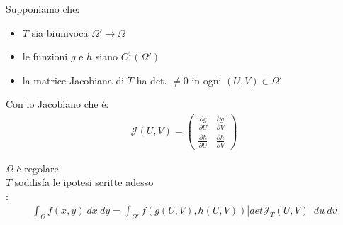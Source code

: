 \documentclass[a4paper, oneside]{article}
\begin{document}
Supponiamo che:
\begin{itemize}
    \item $T$ sia biunivoca $\Omega ' \to \Omega$
    \item le funzioni $g$ e $h$ siano $C^1 (\Omega')$
    \item la matrice Jacobiana di $T$ ha det. $\neq 0$ in ogni $(U,V) \in \Omega'$
\end{itemize}
Con lo Jacobiano che è:
\begin{gather*}
    \mathcal{J} (U,V) = \begin{pmatrix}
        \frac{\partial g}{\partial U} & \frac{\partial g}{\partial V}\\
        \frac{\partial h}{\partial U} & \frac{\partial h}{\partial V}
    \end{pmatrix}
\end{gather*}
\begin{theorem}
     $\Omega$ è regolare\\
     $T$ soddisfa le ipotesi scritte adesso\\
    :
    \begin{gather*}
        \int_{\Omega} f(x,y) \ dx \ dy = \int_{\Omega'} f(g(U,V), h(U,V)) \left\lvert det \mathcal{J}_T (U,V) \right\rvert \ du \ dv 
    \end{gather*}
\end{theorem}
\end{document}
